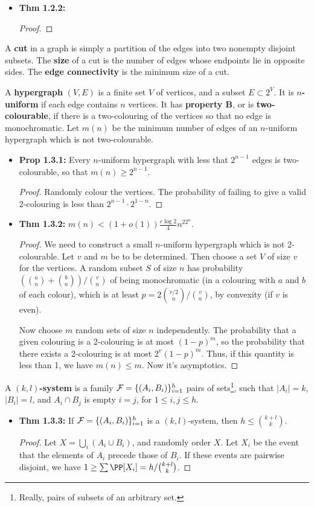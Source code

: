 \documentclass[11pt]{article}
\newenvironment{INT}[1][]{\begin{itemize}\small\item\textbf{#1}}{\end{itemize}}
\begin{document}
\begin{chapter1}
\begin{itemise}
\begin{INT}[Thm 1.2.2:]
\begin{proof}
\end{proof}
\end{INT}
\item A \textbf{cut} in a graph is simply a partition of the edges into two nonempty disjoint subsets. The \textbf{size} of a cut is the number of edges whose endpoints lie in opposite sides. The \textbf{edge connectivity} is the minimum size of a cut.
\item A \textbf{hypergraph} $(V,E)$ is a finite set $V$ of vertices, and a subset $E\subset 2^V$. It is \textbf{$n$-uniform} if each edge contains $n$ vertices. It has \textbf{property B}, or is \textbf{two-colourable}, if there is a two-colouring of the vertices so that no edge is monochromatic. Let $m(n)$ be the minimum number of edges of an $n$-uniform hypergraph which is not two-colourable.
\begin{INT}[Prop 1.3.1:]
Every $n$-uniform hypergraph with less that $2^{n-1}$ edges is two-colourable, so that $m(n)\geq 2^{n-1}$.
\begin{proof}
Randomly colour the vertices. The probability of failing to give a valid 2-colouring is less than $2^{n-1}\cdot 2^{1-n}$.
\end{proof}
\item \textbf{Thm 1.3.2:} $m(n)<(1+o(1))\frac{e\log2}{4}n^22^n$.
\begin{proof}
We need to construct a small $n$-uniform hypergraph which is not 2-colourable. Let $v$ and $m$ be to be determined. Then choose a set $V$ of size $v$ for the vertices. A random subset $S$ of size $n$ has probability $({a\choose n}+{b\choose n})/{v\choose n}$ of being monochromatic (in a colouring with $a$ and $b$ of each colour), which is at least $p=2{v/2\choose n}/{v\choose n}$, by convexity (if $v$ is even).

\INDENT Now choose $m$ random sets of size $n$ independently. The probability that a given colouring is a 2-colouring is at most $(1-p)^m$, so the probability that there exists a 2-colouring is at most $2^v(1-p)^m$. Thus, if this quantity is less than 1, we have $m(n)\leq m$. Now it's asymptotics.
\end{proof}
\end{INT}
\item A \textbf{$(k,l)$-system} is a family $\mathcal{F}=\{(A_i,B_i)\}_{i=1}^h$ pairs of sets\footnote{Really, pairs of subsets of an arbitrary set.}, such that $|A_i|=k$, $|B_i|=l$, and $A_i\cap B_j$ is empty \Iff $i=j$, for $1\leq i,j\leq h$.
\begin{INT}[Thm 1.3.3:]
If $\mathcal{F}=\{(A_i,B_i)\}_{i=1}^h$ is a $(k,l)$-system, then $h\leq {k+l\choose k}$.
\begin{proof}
Let $X=\bigcup_i (A_i\cup B_i)$, and randomly order $X$. Let $X_i$ be the event that the elements of $A_i$ precede those of $B_i$. If these events are pairwise disjoint, we have $1\geq \sum \PP[X_i]=h/{k+l\choose k}$.


\end{proof}
\end{INT}
\end{itemise}
\end{chapter1}
\end{document}
